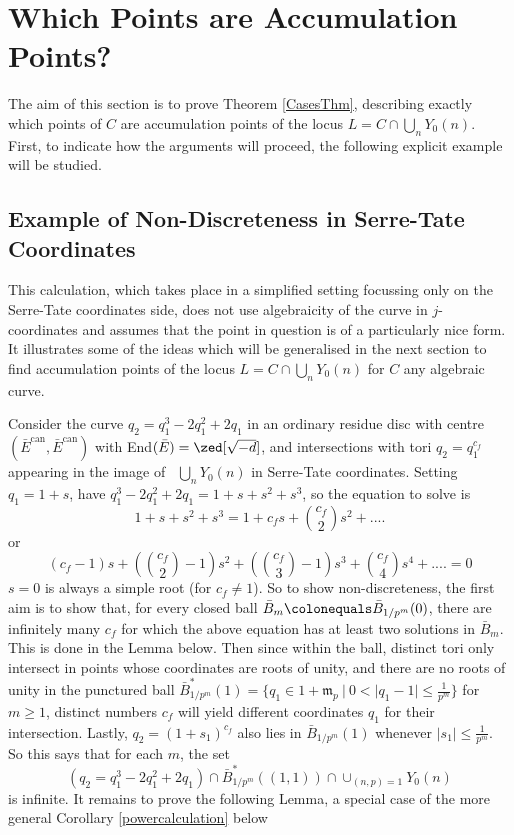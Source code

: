 \documentclass[12pt,letterpaper]{article}
\begin{document}
	
	
	
	
	
	
	
	
	
	
	
	
	
	
	
	
	
	
	
	
	\section{Which Points are Accumulation Points?} \label{Cases}
	
	The aim of this section is to prove Theorem \ref{CasesThm}, describing exactly which points of $C$ are accumulation points of the locus $L =C\cap \bigcup_nY_0(n)$. First, to indicate how the arguments will proceed, the following explicit example will be studied.
	
	
	\subsection{Example of Non-Discreteness in Serre-Tate Coordinates} \label{Ex1}
	
	This calculation, which takes place in a simplified setting focussing only on the Serre-Tate coordinates side, does not use algebraicity of the curve in $j$-coordinates and assumes that the point in question is of a particularly nice form. It illustrates some of the ideas which will be generalised in the next section to find accumulation points of the locus $L=C\cap\bigcup_n Y_0(n)$ for $C$ any algebraic curve.
	
	Consider the curve $q_2 = q_1^3-2q_1^2+2q_1$ in an ordinary residue disc with centre $(\bar{E}^\text{can},\bar{E}^\text{can})$ with End$(\bar{E})=\zed[\sqrt{-d}]$, and intersections with tori $q_2 = q_1^{c_f}$ appearing in the image of \ $\bigcup_nY_0(n)$ in Serre-Tate coordinates. Setting $q_1 = 1+s$, have $q_1^3-2q_1^2+2q_1 = 1+s+s^2+s^3$, so the equation to solve is
	\[1+s+s^2+s^3 = 1+c_f s + \binom{c_f}{2} s^2 +....\]
	or
	\[(c_f-1)s + (\binom{c_f}{2}-1) s^2 + (\binom{c_f}{3}-1)s^3 + \binom{c_f}{4} s^4 +.... =0\]
	$s=0$ is always a simple root (for $c_f\ne1$). So to show non-discreteness, the first aim is to show that, for every closed ball $\bar{B}_m \colonequals \bar{B}_{1/p^m}(0)$, there are infinitely many $c_f$ for which the above equation has at least two solutions in $\bar{B}_m$. This is done in the Lemma below. Then since within the ball, distinct tori only intersect in points whose coordinates are roots of unity, and there are no roots of unity in the punctured ball $\bar{B}_{1/p^m}^*(1) =\{q_1\in 1+\mathfrak{m}_p \ | \ 0<|q_1-1|\leq \frac{1}{p^m} \}$ for $m\geq 1$, distinct numbers $c_f$ will yield different coordinates $q_1$ for their intersection. Lastly, $q_2 = (1+s_1)^{c_f}$ also lies in $\bar{B}_{1/p^m}(1)$ whenever $|s_1|\leq \frac{1}{p^m}$. So  this says that for each $m$, the set
	\[(q_2 = q_1^3-2q_1^2+2q_1)\cap \bar{B}_{1/p^m}^*((1,1))\cap \cup_{(n,p)=1}Y_0(n) \] is infinite. It remains to prove the following Lemma, a special case of the more general Corollary \ref{powercalculation} below
	
\end{document}
